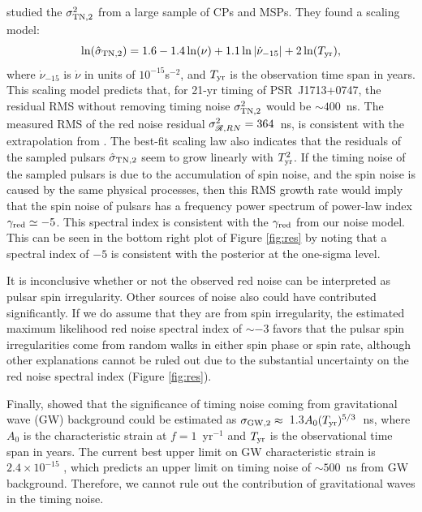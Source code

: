\citet{sc10} studied the $\sigma^2_{\rm TN,2}$ from a large sample of CPs and
MSPs. They found a scaling model:
\begin{equation}
\label{eq:sc10}
\ln(\hat{\sigma}_{\rm TN,2}) = 1.6 - 1.4\ln(\nu) +
1.1\ln|\dot{\nu}_{-15}|+2\ln(T_{\rm yr}),
\end{equation}
where $\dot{\nu}_{-15}$ is $\dot{\nu}$ in units of $10^{-15}$s$^{-2}$, and $T_{\rm yr}$
is the observation time span in years.
This scaling model predicts that, for 21-yr timing of PSR~J1713+0747, the
residual RMS without removing timing noise $\sigma^2_{\rm TN,2}$ would be
$\sim400$~ns. The measured RMS of the red noise residual 
$\sigma^2_{\mathscr{R},RN}=364$~ns, is consistent with the extrapolation
from \citet{sc10}.  
The best-fit scaling law also indicates that the residuals of the
sampled pulsars $\hat{\sigma}_{\rm TN,2}$ seem to grow linearly with $T_{\rm yr}^2$. 
If the timing noise of the sampled pulsars is due to the accumulation of 
spin noise, and the spin noise is caused by the same physical processes,
then this RMS growth rate would imply that the spin noise of pulsars has a
frequency power spectrum of power-law index $\gamma_{\rm red}\simeq -5$. This 
spectral index is consistent with the $\gamma_{\rm red}$
from our noise model. This can be seen in the bottom right plot of Figure \ref{fig:res} 
by noting that a spectral index of $-5$ is consistent with the posterior at the one-sigma
level. 

It is inconclusive whether or not the observed red noise can be interpreted as pulsar spin irregularity.
Other sources of noise also could have contributed significantly.
If we do assume that they are from spin irregularity, 
the estimated maximum likelihood red noise spectral index of $\sim-3$ 
favors that the pulsar spin irregularities come from
random walks in either spin phase or spin rate, although other explanations cannot be ruled out due to the
substantial uncertainty on the red noise spectral index (Figure \ref{fig:res}).

Finally, \citet{sc10} showed that the significance of timing noise coming from
gravitational wave (GW) background could be estimated as
$\sigma_{\rm GW,2} \approx$~1.3$A_0(T_{\rm yr})^{5/3}$~ns, where $A_0$ is the
characteristic strain at $f=1$~yr$^{-1}$ and $T_{\rm yr}$ is the observational
time span in years. The current best upper limit on GW characteristic 
strain is $2.4\times10^{-15}$ \citep{src+13}, which predicts an upper limit on
timing noise of $\sim500$~ns from GW background. Therefore, we
cannot rule out the contribution of gravitational waves in the timing noise.


